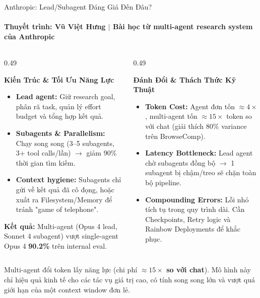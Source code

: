 \documentclass[aspectratio=1610,10pt,xcolor={table}]{beamer}
\begin{document}
\begin{frame}{Anthropic: Lead/Subagent Đáng Giá Đến Đâu?}
  \framesubtitle{Thuyết trình: Vũ Việt Hưng $\vert$ Bài học từ multi-agent research system của Anthropic}

  \begin{columns}[t]
    \begin{column}{0.49\textwidth}
      \begin{block}{\textbf{Kiến Trúc \& Tối Ưu Năng Lực}}
        \scriptsize
        \begin{itemize}
          \item \textbf{Lead agent:} Giữ research goal, phân rã task, quản lý effort budget và tổng hợp kết quả.
          \item \textbf{Subagents \& Parallelism:} Chạy song song (3–5 subagents, 3+ tool calls/lần) $\rightarrow$ giảm 90\% thời gian tìm kiếm.
          \item \textbf{Context hygiene:} Subagents chỉ gửi về kết quả đã cô đọng, hoặc xuất ra Filesystem/Memory để tránh "game of telephone".
        \end{itemize}
        \vspace{0.05cm}
        \textbf{Kết quả:} Multi-agent (Opus 4 lead, Sonnet 4 subagent) vượt single-agent Opus 4 \textbf{90.2\%} trên internal eval.
      \end{block}
    \end{column}

    \begin{column}{0.49\textwidth}
      \begin{alertblock}{\textbf{Đánh Đổi \& Thách Thức Kỹ Thuật}}
        \scriptsize
        \begin{itemize}
          \item \textbf{Token Cost:} Agent đơn tốn $\approx 4\times$, multi-agent tốn $\approx 15\times$ token so với chat (giải thích 80\% variance trên BrowseComp).
          \item \textbf{Latency Bottleneck:} Lead agent chờ subagents đồng bộ $\rightarrow$ 1 subagent bị chậm/treo sẽ chặn toàn bộ pipeline.
          \item \textbf{Compounding Errors:} Lỗi nhỏ tích tụ trong quy trình dài. Cần Checkpoints, Retry logic và Rainbow Deployments để khắc phục.
        \end{itemize}
      \end{alertblock}
    \end{column}
  \end{columns}

  \vspace{0.1cm}
  \begin{tcolorbox}[colback=boxbg,colframe=hcmutblue,title={\textbf{Kết Luận Theo Đề Cương}},fonttitle=\footnotesize\bfseries]
    \footnotesize Multi-agent đổi token lấy năng lực (chi phí \textbf{$\approx 15\times$ so với chat}). Mô hình này chỉ hiệu quả kinh tế cho các tác vụ giá trị cao, có tính song song lớn và vượt quá giới hạn của một context window đơn lẻ.
  \end{tcolorbox}
\end{frame}
\end{document}
